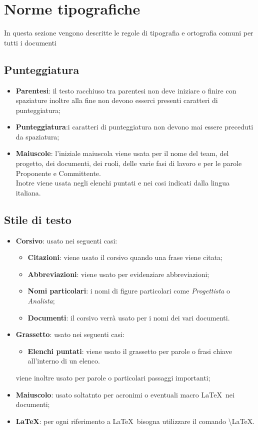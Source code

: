 \documentclass[a4paper]{report}
\begin{document}
	\section{Norme tipografiche}
	In questa sezione vengono descritte le regole di tipografia e ortografia comuni per tutti i documenti 
	\subsection{Punteggiatura}
	\begin{itemize}
		\item \textbf{Parentesi}: il testo racchiuso tra parentesi non deve iniziare o finire con spaziature inoltre alla fine non devono esserci presenti caratteri di punteggiatura;
		\item \textbf{Punteggiatura}:i caratteri di punteggiatura non devono mai essere preceduti da spaziatura;
		\item \textbf{Maiuscole}: l'iniziale maiuscola viene usata per il nome del team, del progetto, dei documenti, dei ruoli, delle varie fasi di lavoro e per le parole Proponente e Committente. \\Inotre viene usata negli elenchi puntati e nei casi indicati dalla lingua italiana.
	\end{itemize}
	
	\subsection{Stile di testo}
	\begin{itemize}
		\item \textbf{Corsivo}: usato nei seguenti casi:
		\begin{itemize}
			\item \textbf{Citazioni}: viene usato il corsivo quando una frase viene citata;
			\item \textbf{Abbreviazioni}: viene usato per evidenziare abbreviazioni;  
			\item \textbf{Nomi particolari}: i nomi di figure particolari come \textit{Progettista} o \textit{Analista};  
			\item \textbf{Documenti}: il corsivo verrà usato per i nomi dei vari documenti.
		\end{itemize}
		
		\item \textbf{Grassetto}: usato nei seguenti casi:
		\begin{itemize}
			\item \textbf{Elenchi puntati}: viene usato il grassetto per parole o frasi chiave all'interno di un elenco.
			
		\end{itemize}			
		viene inoltre usato per parole o particolari passaggi importanti;
		\item \textbf{Maiuscolo}: usato soltatnto per acronimi o eventuali macro \LaTeX\ nei documenti;
		\item \textbf{\LaTeX }: per ogni riferimento a \LaTeX\ bisogna utilizzare il comando \textbackslash LaTeX.
		
	\end{itemize}
	
\end{document}
